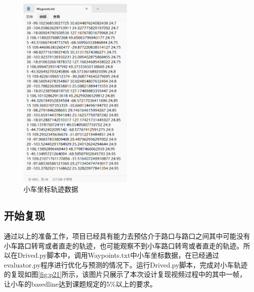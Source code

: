 \begin{figure}[htbp] %
	\centering
	\includegraphics[width=0.5\textwidth]{p20} %
	\caption{小车坐标轨迹数据} %
	\label{fig:p20} %
\end{figure}









\subsection{开始复现}

通过以上的准备工作，项目已经具有能力去预估介于路口与路口之间其中可能没有小车路口转弯或者直走的轨迹，也可能观察不到小车路口转弯或者直走的轨迹。所以在Drived.py脚本中，调用Waypoints.txt中小车坐标数据，在已经通过evaluator.py程序进行优化与预测的情况下。运行Drived.py脚本，完成对小车轨迹的复现如图\ref{fig:p21}所示，该图片只展示了本次设计复现视频过程中的其中一帧，让小车的basedline达到课题规定的5\%以上的要求。



